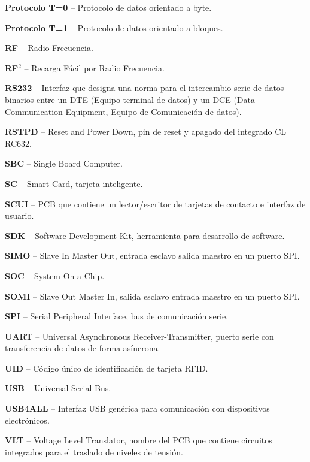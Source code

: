 \begin{glosario}
{\bf{Protocolo T=0}} – Protocolo de datos orientado a byte.

{\bf{Protocolo T=1}} – Protocolo de datos orientado a bloques.

{\bf{RF}} – Radio Frecuencia.

{\bf{RF$^{2}$}} – Recarga Fácil por Radio Frecuencia.

{\bf{RS232}} – Interfaz que designa una norma para el intercambio serie de datos binarios entre un DTE (Equipo terminal de datos) y un DCE (Data Communication Equipment, Equipo de Comunicación de datos).

{\bf{RSTPD}} – Reset and Power Down, pin de reset y apagado del integrado CL RC632.

{\bf{SBC}} – Single Board Computer.

{\bf{SC}} – Smart Card, tarjeta inteligente.

{\bf{SCUI}} – PCB que contiene un lector/escritor de tarjetas de contacto e interfaz de usuario.

{\bf{SDK}} – Software Development Kit, herramienta para desarrollo de software.

{\bf{SIMO}} – Slave In Master Out, entrada esclavo salida maestro en un puerto SPI.

{\bf{SOC}} – System On a Chip.

{\bf{SOMI}} – Slave Out Master In, salida esclavo entrada maestro en un puerto SPI.

{\bf{SPI}} – Serial Peripheral Interface, bus de comunicación serie.

{\bf{UART}} – Universal Asynchronous Receiver-Transmitter, puerto serie con transferencia de datos de forma asíncrona.

{\bf{UID}} – Código único de identificación de tarjeta RFID.

{\bf{USB}} – Universal Serial Bus.

{\bf{USB4ALL}} – Interfaz USB genérica para comunicación con dispositivos electrónicos.

{\bf{VLT}} – Voltage Level Translator, nombre del PCB que contiene circuitos integrados para el traslado de niveles de tensión.

\end{glosario}